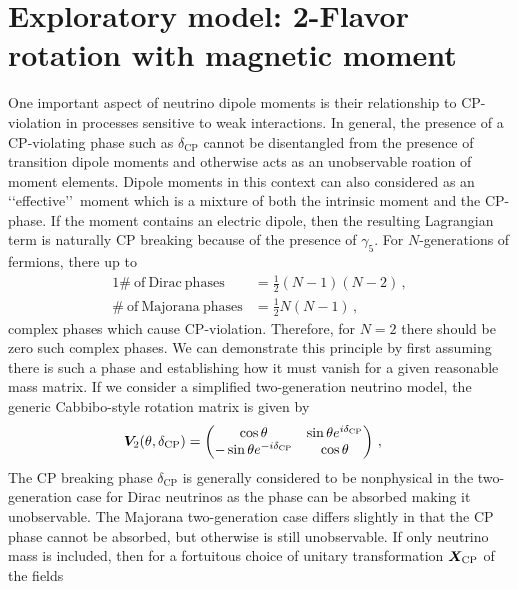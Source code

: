 \section{Exploratory model: 2-Flavor rotation with magnetic moment}
\noindent One important aspect of neutrino dipole moments is their relationship to CP-violation in processes sensitive to weak interactions. In general, the presence of a CP-violating phase such as $\delta_{\mathrm{CP}}$ cannot be disentangled from the presence of transition dipole moments and otherwise acts as an unobservable roation of moment elements. Dipole moments in this context can also considered as an \lq\lq effective\rq\rq\ moment which is a mixture of both the intrinsic moment and the CP-phase. If the moment contains an electric dipole, then the resulting Lagrangian term is naturally CP breaking because of the presence of $\gamma_{5}$. For $N$-generations of fermions, there up to
\begin{alignat}{1}
	\label{cp:eq:01a} \#\ \mathrm{of}\ \mathrm{Dirac}\ \mathrm{phases} &= \frac{1}{2}(N-1)(N-2)\,,\\
	\label{cp:eq:01b} \#\ \mathrm{of}\ \mathrm{Majorana}\ \mathrm {phases} &= \frac{1}{2}N(N-1)\,,
\end{alignat}
complex phases which cause CP-violation. Therefore, for $N=2$ there should be zero such complex phases. We can demonstrate this principle by first assuming there is such a phase and establishing how it must vanish for a given reasonable mass matrix. If we consider a simplified two-generation neutrino model, the generic Cabbibo-style rotation matrix is given by
\begin{alignat}{1}
	\label{cp:eq:02} \boldsymbol{V}_{2}(\theta,\delta_{\mathrm{CP}}) &= 
	\begin{pmatrix}
		\cos{\theta}& \sin{\theta}e^{i\delta_{\mathrm{CP}}} \\
		-\sin{\theta}e^{-i\delta_{\mathrm{CP}}} & \cos{\theta}
	\end{pmatrix}\,,
\end{alignat}
The CP breaking phase $\delta_{\mathrm{CP}}$ is generally considered to be nonphysical in the two-generation case for Dirac neutrinos as the phase can be absorbed making it unobservable. The Majorana two-generation case differs slightly in that the CP phase cannot be absorbed, but otherwise is still unobservable. If only neutrino mass is included, then for a fortuitous choice of unitary transformation $\boldsymbol{X}_{\mathrm{CP}}$ of the fields

